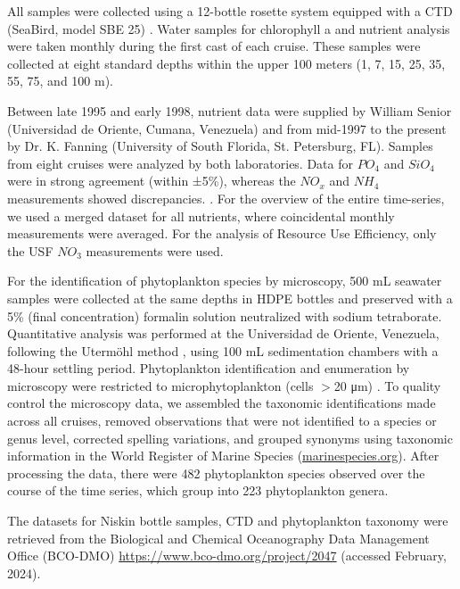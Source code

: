 \documentclass[draft]{agujournal2019}
\begin{document}
    All samples were collected using a 12-bottle rosette system equipped with a CTD (SeaBird, model SBE 25) \cite{astor_yrene_m_handbook_2013}. Water samples for chlorophyll a and nutrient analysis were taken monthly during the first cast of each cruise. These samples were collected at eight standard depths within the upper 100 meters (1, 7, 15, 25, 35, 55, 75, and 100 m). 
    
    Between late 1995 and early 1998, nutrient data were supplied by William Senior (Universidad de Oriente, Cumana, Venezuela) and from mid-1997 to the present by Dr. K. Fanning (University of South Florida, St. Petersburg, FL). Samples from eight cruises were analyzed by both laboratories. Data for $PO_4$ and $SiO_4$ were in strong agreement (within ±5\%), whereas the $NO_x$ and $NH_4$ measurements showed discrepancies. \cite{taylor_ecosystem_2012}. For the overview of the entire time-series, we used a merged dataset for all nutrients, where coincidental monthly measurements were averaged. For the analysis of Resource Use Efficiency, only the USF $NO_3$ measurements were used.
       
    For the identification of phytoplankton species by microscopy, 500 mL seawater samples were collected at the same depths in HDPE bottles and preserved with a 5\% (final concentration) formalin solution neutralized with sodium tetraborate. Quantitative analysis was performed at the Universidad de Oriente, Venezuela, following the Utermöhl method \cite{hasle1978inverted}, using 100 mL sedimentation chambers with a 48-hour settling period. Phytoplankton identification and enumeration by microscopy were restricted to microphytoplankton (cells $>$20 μm) \cite{mutshinda_environmental_2013}.
    To quality control the microscopy data, we assembled the taxonomic identifications made across all cruises, removed observations that were not identified to a species or genus level, corrected spelling variations, and grouped synonyms using taxonomic information in the World Register of Marine Species (\url{marinespecies.org}). After processing the data, there were 482 phytoplankton species observed over the course of the time series, which group into 223 phytoplankton genera.

    
    The datasets for Niskin bottle samples, CTD and phytoplankton taxonomy were retrieved from the Biological and Chemical Oceanography Data Management Office (BCO-DMO) \url{https://www.bco-dmo.org/project/2047} (accessed February, 2024). 
    
\end{document}

